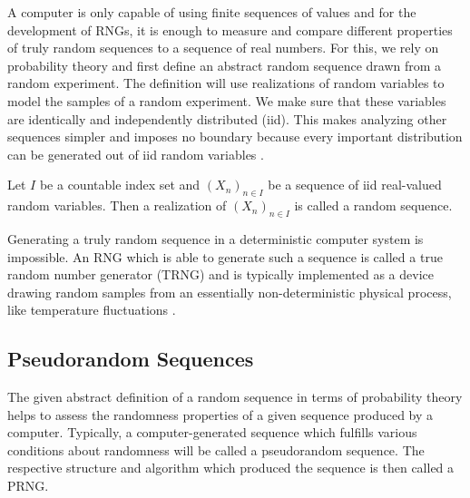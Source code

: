 \documentclass{stdlocal}
\begin{document}
  A computer is only capable of using finite sequences of values and for the development of RNGs, it is enough to measure and compare different properties of truly random sequences to a sequence of real numbers.
  For this, we rely on probability theory and first define an abstract random sequence drawn from a random experiment.
  The definition will use realizations of random variables to model the samples of a random experiment.
  We make sure that these variables are identically and independently distributed (iid).
  This makes analyzing other sequences simpler and imposes no boundary because every important distribution can be generated out of iid random variables \autocite[\ppno~81-111]{kneusel2018}.

  \begin{definition}
    Let $I$ be a countable index set and $(X_n)_{n\in I}$ be a sequence of iid real-valued random variables.
    Then a realization of $(X_n)_{n\in I}$ is called a random sequence.
  \end{definition}
  Generating a truly random sequence in a deterministic computer system is impossible.
  An RNG which is able to generate such a sequence is called a true random number generator (TRNG) and is typically implemented as a device drawing random samples from an essentially non-deterministic physical process, like temperature fluctuations \autocite{intel-drng}.

  \subsection{Pseudorandom Sequences}
  The given abstract definition of a random sequence in terms of probability theory helps to assess the randomness properties of a given sequence produced by a computer.
  Typically, a computer-generated sequence which fulfills various conditions about randomness will be called a pseudorandom sequence.
  The respective structure and algorithm which produced the sequence is then called a PRNG.
\end{document}
